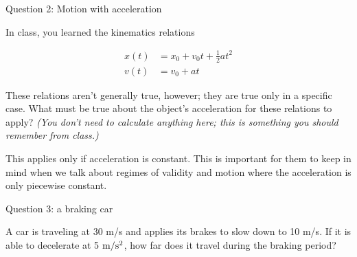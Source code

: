 \documentclass[12pt]{article}
\begin{document}
\vspace{3in}
\newpage
\centerline{\Large Question 2: Motion with acceleration}

In class, you learned the kinematics relations

\begin{align*}
x(t) &= x_0 + v_0t + \frac{1}{2}at^2 \\
v(t) &= v_0 + at
\end{align*}

These relations aren't generally true, however; they are true only in a specific case. What must be true about the object's acceleration for these relations to apply? {\it (You don't need to calculate anything here; this is something you should remember from class.)}

\vspace{1.2in}

{\color{Red}
This applies only if acceleration is constant. This is important for them to keep in mind when we talk about regimes of validity and motion where the acceleration is only piecewise constant.}
\newpage






\centerline{\Large Question 3: a braking car}

A car is traveling at 30 m/s and applies its brakes to slow down to 10 m/s. If it is able to decelerate at 5 $\rm m/\rm s^2$, how far does it travel during the braking period?
\end{document}
